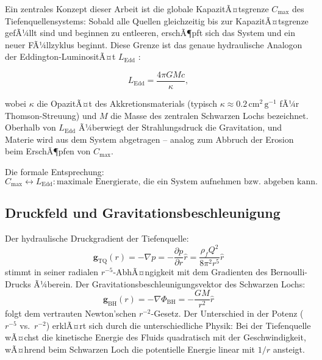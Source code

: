 ﻿\documentclass[12pt,a4paper]{report}
\begin{document}
Ein zentrales Konzept dieser Arbeit ist die globale KapazitÃ¤tsgrenze $C_{\max}$ des Tiefenquellensystems: Sobald alle Quellen gleichzeitig bis zur KapazitÃ¤tsgrenze gefÃ¼llt sind und beginnen zu entleeren, erschÃ¶pft sich das System und ein neuer FÃ¼llzyklus beginnt. Diese Grenze ist das genaue hydraulische Analogon der Eddington-LuminositÃ¤t $L_{\mathrm{Edd}}$ \cite{eddington1926}:

\begin{equation}
	L_{\mathrm{Edd}} = \frac{4\pi G M c}{\kappa},
	\label{eq:eddington_luminositaet}
\end{equation}

wobei $\kappa$ die OpazitÃ¤t des Akkretionsmaterials (typisch $\kappa \approx 0.2\,\mathrm{cm^2\,g^{-1}}$ fÃ¼r Thomson-Streuung) und $M$ die Masse des zentralen Schwarzen Lochs bezeichnet. Oberhalb von $L_{\mathrm{Edd}}$ Ã¼berwiegt der Strahlungsdruck die Gravitation, und Materie wird aus dem System abgetragen -- analog zum Abbruch der Erosion beim ErschÃ¶pfen von $C_{\max}$.

Die formale Entsprechung:
\begin{equation}
	C_{\max} \longleftrightarrow L_{\mathrm{Edd}}: \text{maximale Energierate, die ein System aufnehmen bzw.\ abgeben kann.}
	\label{eq:cmax_ledd_analogie}
\end{equation}

\subsection{Druckfeld und Gravitationsbeschleunigung}

Der hydraulische Druckgradient der Tiefenquelle:
\begin{equation}
	\mathbf{g}_{\mathrm{TQ}}(r) = -\nabla p = -\frac{\partial p}{\partial r}\hat{r} = \frac{\rho_f Q^2}{8\pi^2 r^5}\hat{r}
	\label{eq:druckgradient_tq}
\end{equation}
stimmt in seiner radialen $r^{-5}$-AbhÃ¤ngigkeit mit dem Gradienten des Bernoulli-Drucks Ã¼berein. Der Gravitationsbeschleunigungsvektor des Schwarzen Lochs:
\begin{equation}
	\mathbf{g}_{\mathrm{BH}}(r) = -\nabla\Phi_{\mathrm{BH}} = -\frac{GM}{r^2}\hat{r}
	\label{eq:gravbeschleunigung_bh}
\end{equation}
folgt dem vertrauten Newton'schen $r^{-2}$-Gesetz. Der Unterschied in der Potenz ($r^{-5}$ vs.\ $r^{-2}$) erklÃ¤rt sich durch die unterschiedliche Physik: Bei der Tiefenquelle wÃ¤chst die kinetische Energie des Fluids quadratisch mit der Geschwindigkeit, wÃ¤hrend beim Schwarzen Loch die potentielle Energie linear mit $1/r$ ansteigt.
\end{document}
